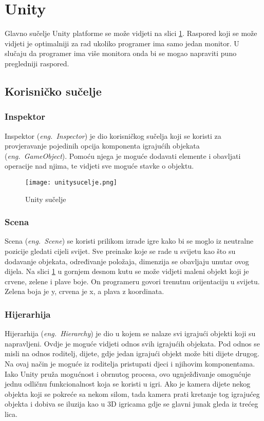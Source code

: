 \section{Unity}
Glavno sučelje Unity platforme se može vidjeti na slici \ref{fig:unitysucelje}. Raspored koji se može vidjeti je optimalniji za rad ukoliko programer ima samo jedan monitor. U slučaju da programer ima više monitora onda bi se mogao napraviti puno pregledniji raspored. 
\subsection{Korisničko sučelje}
\subsubsection{Inspektor}
Inspektor (\emph{eng.~Inspector}) je dio korisničkog sučelja koji se koristi za provjeravanje pojedinih opcija komponenta igrajućih objekata (\emph{eng.~GameObject}). Pomoću njega je moguće dodavati elemente i obavljati operacije nad njima, te vidjeti sve moguće stavke o objektu.

\begin{figure}[h]
	\texttt{[image: unitysucelje.png]}
	\centering
	\caption{Unity sučelje}
	\label{fig:unitysucelje}
\end{figure}
\newpage

\subsubsection{Scena}
Scena (\emph{eng.~Scene}) se koristi prilikom izrade igre kako bi se moglo iz neutralne pozicije gledati cijeli svijet. Sve preinake koje se rade u svijetu kao što su dodavanje objekata, određivanje položaja, dimenzija se obavljaju unutar ovog dijela. Na slici \ref{fig:unitysucelje} u gornjem desnom kutu se može vidjeti maleni objekt koji je crvene, zelene i plave boje. On programeru govori trenutnu orijentaciju u svijetu. Zelena boja je y, crvena je x, a plava z koordinata.

\subsubsection{Hijerarhija}
Hijerarhija (\emph{eng.~Hierarchy}) je dio u kojem se nalaze svi igrajući objekti koji su napravljeni. Ovdje je moguće vidjeti odnos svih igrajućih objekata. Pod odnos se misli na odnos roditelj, dijete, gdje jedan igrajući objekt može biti dijete drugog. Na ovaj način je moguće iz roditelja pristupati djeci i njihovim komponentama. Iako Unity pruža mogućnost i obrnutog procesa, ovo ugnježđivanje omogućuje jednu odličnu funkcionalnost koja se koristi u igri. Ako je kamera dijete nekog objekta koji se pokreće sa nekom silom, tada kamera prati kretanje tog igrajućeg objekta i dobiva se iluzija kao u 3D igricama gdje se glavni junak gleda iz trećeg lica. 

